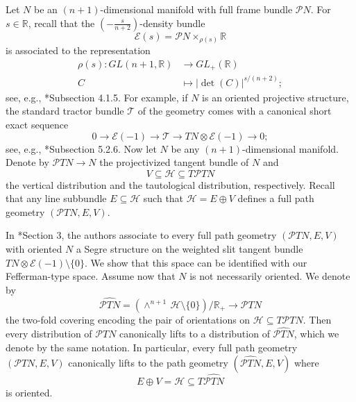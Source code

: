\documentclass[11pt]{amsart}
\newtheorem{theorem}[proposition]{Theorem}
\begin{document}
Let $N$ be an $(n+1)$-dimensional manifold with full frame bundle $\mathcal PN$. For $s\in\mathbb R$, recall that the $(-\frac{s}{n+2})$-density bundle 
\[\mathcal E(s)=\mathcal PN\times_{\rho(s)}\mathbb R\]
is associated to the representation
\begin{align*}
    \rho(s):GL(n+1,\mathbb R)&\to GL_+(\mathbb R)\\
    C&\mapsto|\det(C)|^{s/(n+2)};
\end{align*}
see, e.g., \cite{Book}*{Subsection 4.1.5}. For example, if $N$ is an oriented projective structure, the standard tractor bundle $\mathcal T$ of the geometry comes with a canonical short exact sequence
\[0\to\mathcal E(-1)\to\mathcal T\to TN\otimes\mathcal E(-1)\to 0;\]
see, e.g., \cite{Book}*{Subsection 5.2.6}. Now let $N$ be any $(n+1)$-dimensional manifold. Denote by $\mathcal PTN\to N$ the projectivized tangent bundle of $N$ and \[V\subseteq\mathcal H\subseteq T\mathcal PTN\] the vertical distribution and the tautological distribution, respectively. Recall that any line subbundle $E\subseteq\mathcal H$ such that $\mathcal H=E\oplus V$ defines a full path geometry $(\mathcal PTN,E,V)$.

In \cite{CrSa}*{Section 3}, the authors associate to every full path geometry $(\mathcal PTN,E,V)$ with oriented $N$ a Segre structure on the weighted slit tangent bundle $TN\otimes\mathcal E(-1)\setminus\{0\}$. We show that this space can be identified with our Fefferman-type space. Assume now that $N$ is not necessarily oriented. We denote by
\[\widehat{\mathcal PTN}=(\wedge^{n+1}\,\mathcal H\setminus\{0\})/\mathbb R_+\to\mathcal PTN\]
the two-fold covering encoding the pair of orientations on $\mathcal H\subseteq T\mathcal PTN$. Then every distribution of $\mathcal PTN$ canonically lifts to a distribution of $\widehat{\mathcal PTN}$, which we denote by the same notation. In particular, every full path geometry $(\mathcal PTN,E,V)$ canonically lifts to the path geometry $(\widehat{\mathcal PTN},E,V)$ where \[E\oplus V=\mathcal H\subseteq T\widehat{\mathcal PTN}\] is oriented.
\end{document}
